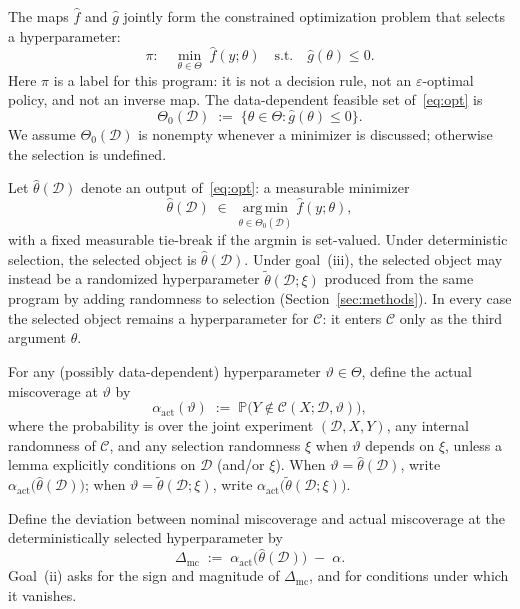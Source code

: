 \documentclass[12pt]{article}
\theoremstyle{plain}
\begin{document}
\label{def:pi}
The maps $\hat f$ and $\hat g$ jointly form the constrained optimization problem that selects a hyperparameter:
\begin{equation}
    \label{eq:opt}
    \pi:
    \quad
    \min_{\theta\in\Theta}
    \;
    \hat f(y;\theta)
    \quad
    \text{s.t.}
    \quad
    \hat g(\theta)\le 0.
\end{equation}
Here $\pi$ is a label for this program: it is not a decision rule, not an $\varepsilon$-optimal policy, and not an inverse map.
\label{def:feasible}
The data-dependent feasible set of~\eqref{eq:opt} is
\[
\Theta_0(\mathcal{D})
\;:=\;
\bigl\{\theta\in\Theta:\hat g(\theta)\le 0\bigr\}.
\]
We assume $\Theta_0(\mathcal{D})$ is nonempty whenever a minimizer is discussed; otherwise the selection is undefined.

\label{def:thetahat}
Let $\hat\theta(\mathcal{D})$ denote an output of~\eqref{eq:opt}: a measurable minimizer
\[
\hat\theta(\mathcal{D})
\;\in\;
\operatorname*{arg\,min}_{\theta\in\Theta_0(\mathcal{D})}
\hat f(y;\theta),
\]
with a fixed measurable tie-break if the argmin is set-valued.
Under deterministic selection, the selected object is $\hat\theta(\mathcal{D})$.
Under goal~(iii), the selected object may instead be a randomized hyperparameter $\widetilde\theta(\mathcal{D};\xi)$ produced from the same program by adding randomness to selection (Section~\ref{sec:methods}).
In every case the selected object remains a hyperparameter for $\mathcal{C}$: it enters $\mathcal{C}$ only as the third argument $\theta$.

\label{def:alpha-act}
For any (possibly data-dependent) hyperparameter $\vartheta\in\Theta$, define the actual miscoverage at $\vartheta$ by
\begin{equation}
  \label{eq:alpha-act}
  \alpha_{\mathrm{act}}(\vartheta)
  \;:=\;
  \mathbb{P}\bigl( Y\notin\mathcal{C}(X;\mathcal{D},\vartheta) \bigr),
\end{equation}
where the probability is over the joint experiment $(\mathcal{D},X,Y)$, any internal randomness of $\mathcal{C}$, and any selection randomness $\xi$ when $\vartheta$ depends on $\xi$, unless a lemma explicitly conditions on $\mathcal{D}$ (and/or $\xi$).
When $\vartheta=\hat\theta(\mathcal{D})$, write $\alpha_{\mathrm{act}}\bigl(\hat\theta(\mathcal{D})\bigr)$; when $\vartheta=\widetilde\theta(\mathcal{D};\xi)$, write $\alpha_{\mathrm{act}}\bigl(\widetilde\theta(\mathcal{D};\xi)\bigr)$.

\label{def:Delta-mc}
Define the deviation between nominal miscoverage and actual miscoverage at the deterministically selected hyperparameter by
\begin{equation}
  \label{eq:Delta-mc}
  \Delta_{\mathrm{mc}}
  \;:=\;
  \alpha_{\mathrm{act}}\bigl(\hat\theta(\mathcal{D})\bigr)
  \;-\;
  \alpha.
\end{equation}
Goal~(ii) asks for the sign and magnitude of $\Delta_{\mathrm{mc}}$, and for conditions under which it vanishes.
\end{document}
